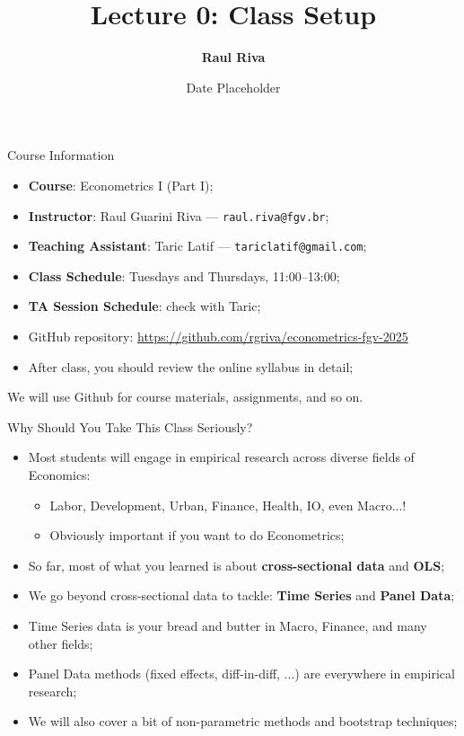 \documentclass[aspectratio=169, xcolor=dvipsnames, 12pt]{beamer}
\title[]{Lecture 0: Class Setup}
\author{\textbf{Raul Riva}}
\institute{\scriptsize \textcolor{FGVBlue}{FGV EPGE}}
\date{Date Placeholder}
\begin{document}
\begin{frame}[plain]
  \titlepage
\end{frame}

\begin{frame}{Course Information}
  \begin{itemize}
    \item \textbf{Course}: Econometrics I (Part I);
    \item \textbf{Instructor}: Raul Guarini Riva — \texttt{raul.riva@fgv.br};
    \item \textbf{Teaching Assistant}: Taric Latif — \texttt{tariclatif@gmail.com};
    \item \textbf{Class Schedule}: Tuesdays and Thursdays, 11:00–13:00;
    \item \textbf{TA Session Schedule}: check with Taric;
    \item GitHub repository: \url{https://github.com/rgriva/econometrics-fgv-2025}
    \item After class, you should review the online syllabus in detail;
  \end{itemize}
  \vspace{1em}
  \centering
  \alert{We will use Github for course materials, assignments, and so on.}
\end{frame}

\begin{frame}{Why Should You Take This Class Seriously?}
  \begin{itemize}
    \item Most students will engage in empirical research across diverse fields of Economics:
      \begin{itemize}
        \item Labor, Development, Urban, Finance, Health, IO, even Macro...!
        \item Obviously important if you want to do Econometrics;
      \end{itemize}
    \item So far, most of what you learned is about \textbf{cross-sectional data} and \textbf{OLS};
    \item We go beyond cross-sectional data to tackle: \textbf{Time Series} and \textbf{Panel Data};
    \item Time Series data is your bread and butter in Macro, Finance, and many other fields;
    \item Panel Data methods (fixed effects, diff-in-diff, ...) are everywhere in empirical research;
    \item We will also cover a bit of non-parametric methods and bootstrap techniques;
  \end{itemize}
\end{frame}
\end{document}
